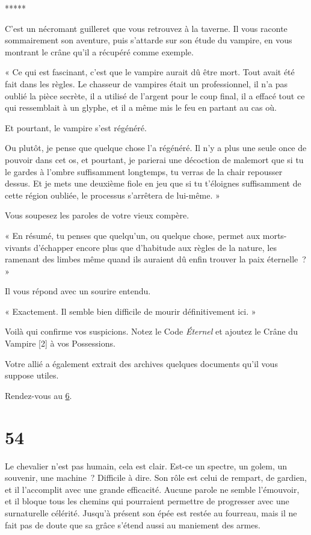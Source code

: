 \documentclass{report}
\newcommand{\gsection}[1]{
    \section{#1}
    \label{section-#1}
}
\newcommand{\glink}[1]{\hyperref[section-#1]{#1}}
\newcommand{\ellipse}{
    \begin{center}
        *****
    \end{center}
}
\begin{document}
\ellipse

C'est un nécromant guilleret que vous retrouvez à la taverne. Il vous raconte sommairement son aventure, puis s'attarde sur son étude du vampire, en vous montrant le crâne qu'il a récupéré comme exemple.

« Ce qui est fascinant, c'est que le vampire aurait dû être mort. Tout avait été fait dans les règles. Le chasseur de vampires était un professionnel, il n'a pas oublié la pièce secrète, il a utilisé de l'argent pour le coup final, il a effacé tout ce qui ressemblait à un glyphe, et il a même mis le feu en partant au cas où.

Et pourtant, le vampire s'est régénéré.

Ou plutôt, je pense que quelque chose l'a régénéré. Il n'y a plus une seule once de pouvoir dans cet os, et pourtant, je parierai une décoction de malemort que si tu le gardes à l'ombre suffisamment longtemps, tu verras de la chair repousser dessus. Et je mets une deuxième fiole en jeu que si tu t'éloignes suffisamment de cette région oubliée, le processus s'arrêtera de lui-même. »

Vous soupesez les paroles de votre vieux compère.

« En résumé, tu penses que quelqu'un, ou quelque chose, permet aux morts-vivants d'échapper encore plus que d'habitude aux règles de la nature, les ramenant des limbes même quand ils auraient dû enfin trouver la paix éternelle ? »

Il vous répond avec un sourire entendu.

« Exactement. Il semble bien difficile de mourir définitivement ici. »

Voilà qui confirme vos suspicions. Notez le Code \emph{Éternel} et ajoutez le Crâne du Vampire [2] à vos Possessions.

Votre allié a également extrait des archives quelques documents qu'il vous suppose utiles.

Rendez-vous au \glink{6}.

\gsection{54}

Le chevalier n'est pas humain, cela est clair. Est-ce un spectre, un golem, un souvenir, une machine ? Difficile à dire. Son rôle est celui de rempart, de gardien, et il l'accomplit avec une grande efficacité. Aucune parole ne semble l'émouvoir, et il bloque tous les chemins qui pourraient permettre de progresser avec une surnaturelle célérité. Jusqu'à présent son épée est restée au fourreau, mais il ne fait pas de doute que sa grâce s'étend aussi au maniement des armes.
\end{document}
